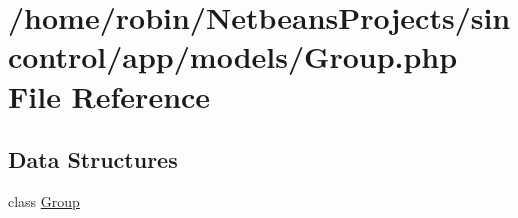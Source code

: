 \hypertarget{_group_8php}{}\section{/home/robin/\+Netbeans\+Projects/sincontrol/app/models/\+Group.php File Reference}
\label{_group_8php}
\subsection*{Data Structures}
\begin{DoxyCompactItemize}
\item 
class \hyperlink{class_group}{Group}
\end{DoxyCompactItemize}
